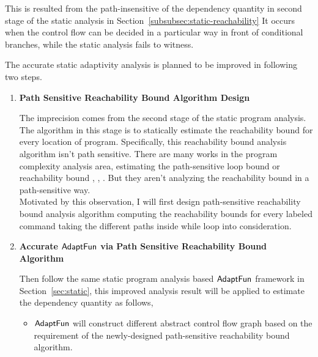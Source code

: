 This is resulted from the  path-insensitive of the dependency quantity in
second stage of the static analysis in Section~\ref{subsubsec:static-reachability}
It occurs when the control flow can be decided in a particular way in front of conditional branches, 
while the static analysis fails to witness. 

The accurate static adaptivity analysis is planned to be improved in following two steps.
\begin{enumerate}
    \item \textbf{Path Sensitive Reachability Bound Algorithm Design}
    
    The imprecision comes from the second stage of the static program analysis.
    The algorithm in this stage is to statically estimate the 
    reachability bound for every location of program.
    Specifically, this reachability bound analysis algorithm isn't path sensitive. 
    There are many works in the program complexity analysis area, estimating the path-sensitive loop bound 
    or reachability bound
    \cite{GustafssonEL05, HumenbergerJK18}, 
    \cite{BrockschmidtEFFG16,AlbertAGP08,AliasDFG10,Flores-MontoyaH14}, 
    \cite{GulwaniZ10, SinnZV17,GulwaniJK09, GulwaniMC09, abs-2203-04243}. 
    But they aren't analyzing the reachability
    bound in a path-sensitive way.
    \\
    Motivated by this observation, I will first design path-sensitive reachability bound analysis algorithm computing the 
    reachability bounds for every labeled command taking the different paths inside while loop into consideration.
    \item \textbf{Accurate $\textsf{AdaptFun}$ via Path Sensitive Reachability Bound Algorithm}

    Then follow the same static program analysis based $\textsf{AdaptFun}$ framework in Section~\ref{sec:static},
this improved analysis result will be applied to estimate the dependency quantity as follows,
\begin{itemize}
    \item $\textsf{AdaptFun}$ will construct different abstract control flow graph based on the requirement of the newly-designed
    path-sensitive reachability bound algorithm.


\end{itemize}
\end{enumerate}
